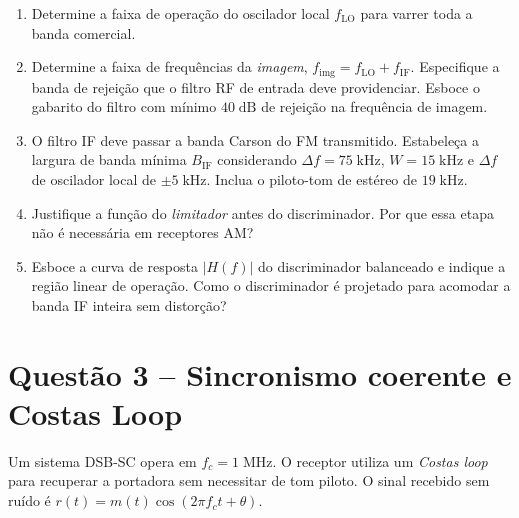 \documentclass[11pt,a4paper]{article}
\begin{document}
\begin{enumerate}[label=\alph*)]
  \item Determine a faixa de operação do oscilador local $f_{\text{LO}}$ para varrer toda a banda comercial.
  \item Determine a faixa de frequências da \emph{imagem}, $f_{\text{img}} = f_{\text{LO}} + f_{\text{IF}}$. Especifique a banda de rejeição que o filtro RF de entrada deve providenciar. Esboce o gabarito do filtro com mínimo $40\;\text{dB}$ de rejeição na frequência de imagem.
  \item O filtro IF deve passar a banda Carson do FM transmitido. Estabeleça a largura de banda mínima $B_{\text{IF}}$ considerando $\Delta f = 75\;\text{kHz}$, $W = 15\;\text{kHz}$ e $\Delta f$ de oscilador local de $\pm 5\;\text{kHz}$. Inclua o piloto-tom de estéreo de $19\;\text{kHz}$.
  \item Justifique a função do \emph{limitador} antes do discriminador. Por que essa etapa não é necessária em receptores AM?
  \item Esboce a curva de resposta $|H(f)|$ do discriminador balanceado e indique a região linear de operação. Como o discriminador é projetado para acomodar a banda IF inteira sem distorção?
\end{enumerate}

\section*{Questão 3 -- Sincronismo coerente e Costas Loop}

Um sistema DSB-SC opera em $f_c = 1\;\text{MHz}$. O receptor utiliza um \emph{Costas loop} para recuperar a portadora sem necessitar de tom piloto. O sinal recebido sem ruído é $r(t) = m(t)\cos(2\pi f_c t + \theta)$.

\begin{center}
\end{center}
\end{document}
